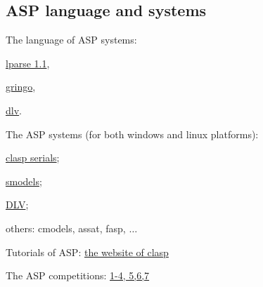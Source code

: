 \subsection{ASP language and systems}
\begin{frame}
  The language of ASP systems:

  \begin{itemize}  {\color{blue}
    \item \href{www.tcs.hut.fi/Software/smodels/lparse.ps}{lparse 1.1},
    \item \href{http://potassco.sourceforge.net/}{gringo},
    \item \href{http://www.dlvsystem.com/dlvsystem/index.php/DLV}{dlv}.}
  \end{itemize}

  The ASP systems (for both windows and linux platforms):
  \begin{itemize}{\color{blue}
    \item \href{http://potassco.sourceforge.net/}{clasp serials}; %
    \item \href{http://www.tcs.hut.fi/Software/smodels/}{smodels}; %
    \item \href{http://www.dlvsystem.com/dlvsystem/index.php/DLV}{DLV};} %
    \item others: cmodels, assat, fasp, $\ldots$
  \end{itemize}
  \hrulefill
  \begin{itemize}{\color{blue}
    \item Tutorials of ASP: \href{http://potassco.sourceforge.net/teaching.html}{the website of clasp}
    \item The ASP competitions: \href{https://www.mat.unical.it/aspcomp2013}{1-4, 5,6,7}}
  \end{itemize}

\end{frame}

